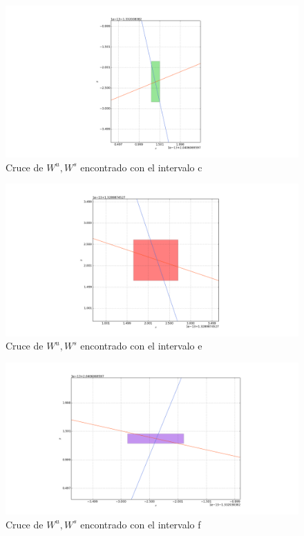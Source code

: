 \begin{figure}[H]
\centering
\includegraphics[scale=0.4]{cruce3}
\caption{Cruce de $W^{u},W^{s}$ encontrado con el intervalo c }
\label{cruce3}
\end{figure}


\begin{figure}[H]
\centering
\includegraphics[scale=0.4]{cruce5}
\caption{Cruce de $W^{u},W^{s}$ encontrado con el intervalo e }
\label{cruce5}
\end{figure}

\begin{figure}[H]
\centering
\includegraphics[scale=0.4]{cruce6}
\caption{Cruce de $W^{u},W^{s}$ encontrado con el intervalo f }
\label{cruce6}
\end{figure}

